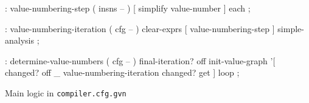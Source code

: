 \centering

  \begin{factorcode}
    : value-numbering-step ( insns -- )
        [ simplify value-number ] each ;

    : value-numbering-iteration ( cfg -- )
        clear-exprs [ value-numbering-step ] simple-analysis ;

    : determine-value-numbers ( cfg -- )
        final-iteration? off
        init-value-graph
        '[
            changed? off
            _ value-numbering-iteration
            changed? get
        ] loop ;
  \end{factorcode}

\caption{Main logic in \texttt{compiler.cfg.gvn}}
